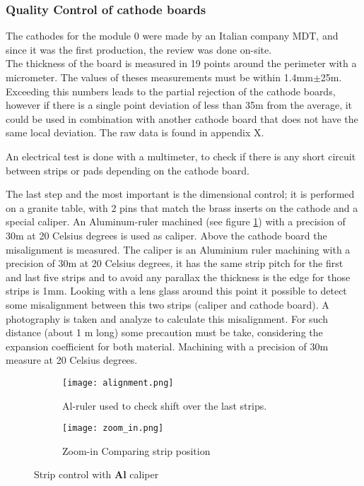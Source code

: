 \subsubsection{Quality Control of cathode boards}

The cathodes for the module 0 were made by an Italian company MDT, and since it was the first production, the review was
done on-site.\\
The thickness of the board is measured in 19 points around the perimeter with a micrometer. The
values of theses measurements must be within 1.4mm$\pm$25\micro m. Exceeding this numbers leads to the partial rejection
of the cathode boards, however if there is a single point deviation of less than 35\micro m from the average, it
could be used in combination with another cathode board that does not have the same local deviation. The raw data is
found in appendix X.\par An electrical test is done with a multimeter, to check if there is any short circuit between strips or
pads depending on the cathode board.\par
The last step and the most important is the dimensional control; it is performed on a granite table, with 2 pins that match the brass inserts
on the cathode and a special caliper. 
An Aluminum-ruler machined (see figure \ref{fig:ruler}) with a precision of 30\micro m at 20 Celsius
degrees is used as caliper.  Above the cathode board the misalignment is measured. The caliper is an
Aluminium ruler machining  with a precision of 30\micro m at 20 Celsius degrees, it has the same strip pitch for the first
and last five strips and to avoid any parallax the thickness is the edge for those strips is 1mm. Looking with a lens
glass around this point it possible to detect some misalignment between this two strips (caliper and cathode board). A
photography is taken and analyze to calculate this misalignment. For such distance (about 1 m long) some precaution must
be take, considering the expansion coefficient for both material.  Machining with a precision of 30\micro m measure at 20
Celsius degrees.\par

\begin{figure}[ht]
	\centering
	\hspace*{\fill}
	{\begin{subfigure}[b]{0.35\textwidth}
		\texttt{[image: alignment.png]}
		\caption{Al-ruler used to check shift over the last strips.}
		\label{fig:ruler}
	\end{subfigure}
	}
	\hfill
	{\begin{subfigure}[b]{0.35\textwidth}
		\texttt{[image: zoom\_in.png]}
		\caption{Zoom-in Comparing strip position}
		\label{fig:zoom}
	\end{subfigure}
	}
	\hspace*{\fill}
	\caption{Strip control with {\bf Al} caliper}
\end{figure}

